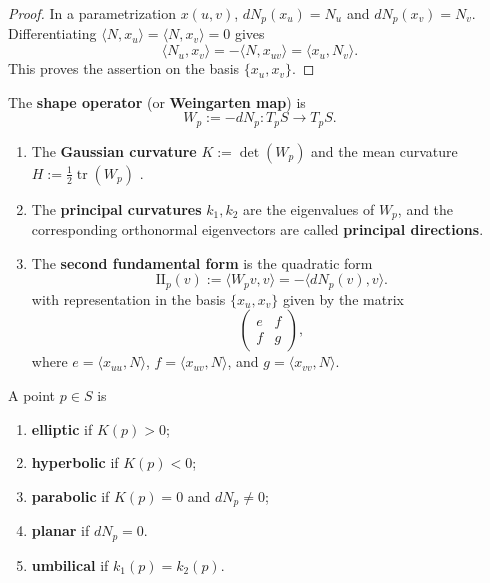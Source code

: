 \documentclass[12pt, oneside]{book}
\begin{document}
\begin{proof}
    In a parametrization $x(u,v)$, $dN_p(x_u)=N_u$ and
    $dN_p(x_v)=N_v$.  Differentiating
    $\langle N,x_u\rangle=\langle N,x_v\rangle=0$ gives
    \[
        \langle N_u,x_v\rangle=-\langle N,x_{uv}\rangle
        =\langle x_u,N_v\rangle.
    \]
    This proves the assertion on the basis $\{x_u,x_v\}$.
\end{proof}

\begin{definition}
    The \textbf{shape operator} (or \textbf{Weingarten map}) is
    \[
        W_p:=-dN_p:T_pS\longrightarrow T_pS.
    \]
    \begin{enumerate}

        \item
              The \textbf{Gaussian curvature} $K:= \det (W_p) $ and the mean curvature
              $H:=\frac12\operatorname{tr}(W_p)$ .
        \item
              The \textbf{principal curvatures} $k_1, k_2$ are the eigenvalues of $W_p$, and the corresponding orthonormal  eigenvectors are called \textbf{principal directions}.
        \item The \textbf{second fundamental form} is the quadratic form
              \[
                  \mathrm{II}_p(v)
                  :=
                  \langle W_p v,v\rangle
                  =-\langle dN_p(v),v\rangle.
              \]
              with representation in the basis $\{x_u,x_v\}$ given by the matrix
              \[
                  \begin{pmatrix}
                      e & f \\
                      f & g
                  \end{pmatrix},
              \]
              where $e=\langle x_{uu},N\rangle$, $f=\langle x_{uv},N\rangle$, and $g=\langle x_{vv},N\rangle$.
    \end{enumerate}
\end{definition}

\begin{definition}
    A point $p\in S$ is
    \begin{enumerate}
        \item \textbf{elliptic} if $K(p)>0$;
        \item \textbf{hyperbolic} if $K(p)<0$;
        \item \textbf{parabolic} if $K(p)=0$ and $dN_p\neq0$;
        \item \textbf{planar} if $dN_p=0$.
        \item \textbf{umbilical} if $k_1(p)=k_2(p)$.
    \end{enumerate}
\end{definition}
\end{document}
